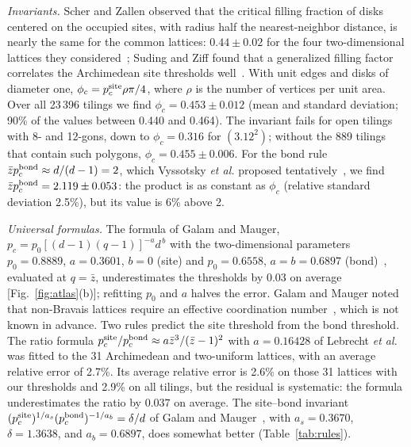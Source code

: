 \documentclass[pre,twocolumn,superscriptaddress,longbibliography,floatfix]{revtex4-2}
\newcommand{\pc}{p_c}
\newcommand{\ps}{p_c^{\rm site}}
\newcommand{\pb}{p_c^{\rm bond}}
\newcommand{\zb}{\bar z}
\begin{document}
\textit{Invariants.} Scher and Zallen observed that the critical filling fraction of disks centered on the occupied sites, with radius half the nearest-neighbor distance, is nearly the same for the common lattices: $0.44\pm0.02$ for the four two-dimensional lattices they considered~\cite{ScherZallen70}; Suding and Ziff found that a generalized filling factor correlates the Archimedean site thresholds well~\cite{SudingZiff99}. With unit edges and disks of diameter one, $\phi_c=\ps\rho\pi/4$, where $\rho$ is the number of vertices per unit area. Over all 23\,396 tilings we find $\phi_c=0.453\pm0.012$ (mean and standard deviation; 90\% of the values between 0.440 and 0.464). The invariant fails for open tilings with 8- and 12-gons, down to $\phi_c=0.316$ for $(3.12^2)$; without the 889 tilings that contain such polygons, $\phi_c=0.455\pm0.006$. For the bond rule $\zb\pb\approx d/(d-1)=2$, which Vyssotsky \textit{et al.} proposed tentatively~\cite{Vyssotsky61}, we find $\zb\pb=2.119\pm0.053$: the product is as constant as $\phi_c$ (relative standard deviation 2.5\%), but its value is 6\% above 2.

\textit{Universal formulas.} The formula of Galam and Mauger, $\pc=p_0[(d-1)(q-1)]^{-a}d^{\,b}$ with the two-dimensional parameters $p_0=0.8889$, $a=0.3601$, $b=0$ (site) and $p_0=0.6558$, $a=b=0.6897$ (bond)~\cite{GalamMauger96}, evaluated at $q=\zb$, underestimates the thresholds by 0.03 on average [Fig.~\ref{fig:atlas}(b)]; refitting $p_0$ and $a$ halves the error. Galam and Mauger noted that non-Bravais lattices require an effective coordination number~\cite{GalamMauger97}, which is not known in advance. Two rules predict the site threshold from the bond threshold. The ratio formula $\ps/\pb\approx a\zb^3/(\zb-1)^2$ with $a=0.16428$ of Lebrecht \textit{et al.}~\cite{Lebrecht21} was fitted to the 31 Archimedean and two-uniform lattices, with an average relative error of 2.7\%. Its average relative error is 2.6\% on those 31 lattices with our thresholds and 2.9\% on all tilings, but the residual is systematic: the formula underestimates the ratio by $0.037$ on average. The site--bond invariant $(\ps)^{1/a_s}(\pb)^{-1/a_b}=\delta/d$ of Galam and Mauger~\cite{GalamMauger98}, with $a_s=0.3670$, $\delta=1.3638$, and $a_b=0.6897$, does somewhat better (Table~\ref{tab:rules}).
\end{document}
